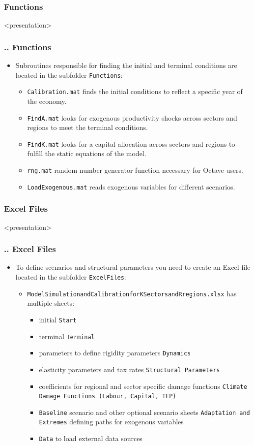 \documentclass[11pt,aspectratio=169]{beamer}
\begin{document}
\subsubsection{Functions}
\begin{frame}<presentation>
\frametitle{{\thesection.\thesubsection.\thesubsubsection} Functions}
\begin{itemize}
\item Subroutines responsible for finding the initial and terminal conditions are located in the subfolder {\tt Functions}:
\begin{itemize}
\item {\tt Calibration.mat} finds the initial conditions to reflect a specific year of the economy.
\item {\tt FindA.mat} looks for exogenous productivity shocks across sectors and regions to meet the terminal conditions.
\item {\tt FindK.mat} looks for a capital allocation across sectors and regions to fulfill the static equations of the model.
\item {\tt rng.mat} random number generator function necessary for Octave users.
\item {\tt LoadExogenous.mat} reads exogenous variables for different scenarios.
\end{itemize}
\end{itemize}
\end{frame}

\subsubsection{Excel Files}
\begin{frame}<presentation>
\frametitle{{\thesection.\thesubsection.\thesubsubsection} Excel Files}
\begin{itemize}
\item To define scenarios and structural parameters you need to create an Excel file located in the subfolder {\tt ExcelFiles}:
\begin{itemize}
\item {\tt ModelSimulationandCalibrationforKSectorsandRregions.xlsx} has multiple sheets:
\begin{itemize}
\item initial {\tt Start}
\item terminal {\tt Terminal}
\item parameters to define rigidity parameters {\tt Dynamics}
\item elasticity parameters and tax rates {\tt Structural Parameters}
\item coefficients for regional and sector specific damage functions {\tt Climate Damage Functions (Labour, Capital, TFP)}
\item {\tt Baseline} scenario and other optional scenario sheets {\tt Adaptation and Extremes} defining paths for exogenous variables 
\item {\tt Data} to load external data sources
\end{itemize}
\end{itemize}
\end{itemize}
\end{frame}
\end{document}

